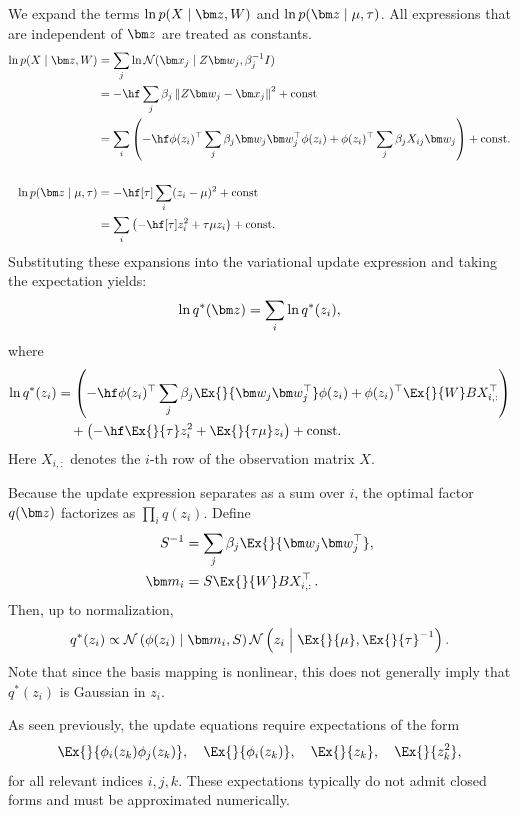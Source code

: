 We expand the terms $\ln p(X \mid \vect{z}, W)$ and $\ln p(\vect{z} \mid \mu, \tau)$.
All expressions that are independent of $\vect{z}$ are treated as constants.
\begin{align*}
    \ln p(X \mid \vect{z}, W)
    &= \sum_{j} \ln \mathcal{N} (\vect{x}_j \mid Z \vect{w}_j,  \beta_j^{-1}I) \\
    &= -\hf \sum_j \beta_j \normsq{Z\vect{w}_j - \vect{x}_j} + \text{const} \\
    &= \sum_{i} \left(-\hf \trans{\phi (z_i)} \sum_j \beta_j \vect{w}_j \trans{\vect{w}_j} \phi (z_i)  +
                    \trans{\phi(z_i)} \sum_j \beta_j X_{ij} \vect{w}_j \right) + \text{const}. \\ \\
    \ln p(\vect{z} \mid \mu, \tau) &= -\hf[\tau] \sum_i (z_i - \mu) ^ 2 + \text{const} \\
    &= \sum_i \left( -\hf[\tau] z_i^2 + \tau \mu z_i \right) + \text{const}.
\end{align*}
Substituting these expansions into the variational update expression and taking the expectation yields:
\begin{equation*}
    \ln q^*(\vect{z}) = \sum_i \ln q^*(z_i),
\end{equation*}
where
\begin{align*}
    \ln q^*(z_i) &=
    \left(-\hf \trans{\phi (z_i)} \sum_j \beta_j \Ex{}{\vect{w}_j \trans{\vect{w}_j}} \phi (z_i) +
        \trans{\phi (z_i)} \Ex{}{W} B \trans{X_{i,:}} \right) \\
    &\quad + \left( -\hf \Ex{}{\tau} z_i^2 + \Ex{}{\tau \mu} z_i \right)
    + \text{const}.
\end{align*}
Here $X_{i,:}$ denotes the $i$-th row of the observation matrix $X$.

Because the update expression separates as a sum over
$i$, the optimal factor $q(\vect{z})$ factorizes as $\prod_i q(z_i)$.
Define
\begin{align*}
    S^{-1} &= \sum_j \beta_j \Ex{}{\vect{w}_j \trans{\vect{w}_j}}, \\
    \vect{m}_i &= S \Ex{}{W} B \trans{X_{i,:}}\,.
\end{align*}
Then, up to normalization,
\begin{equation*}
    q^*(z_i) \propto
    \Nor{\phi(z_i)}{\vect{m}_i}{S}
    \Nor{z_i}{\Ex{}{\mu}}{\Ex{}{\tau}^{-1}}.
\end{equation*}
Note that since the basis mapping is nonlinear,
this does not generally imply that $q^*(z_i)$ is Gaussian in $z_i$.

As seen previously, the update equations require expectations of the form
\begin{equation*}
    \Ex{}{\phi_i(z_k)\phi_j(z_k)}, \quad
    \Ex{}{\phi_i(z_k)}, \quad
    \Ex{}{z_k}, \quad
    \Ex{}{z_k^2},
\end{equation*}
for all relevant indices $i,j,k$.
These expectations typically do not admit closed forms and must be approximated numerically.